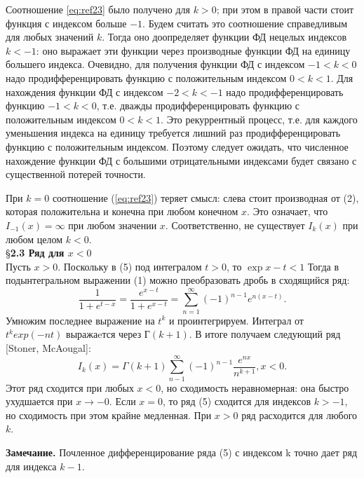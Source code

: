 Соотношение \ref{eq:ref23} было получено для $k > 0$; при этом в правой части стоит
функция с индексом больше $-1$. Будем считать это соотношение справедливым
для любых значений $k$. Тогда оно доопределяет функции ФД нецелых индексов
$k < -1$: оно выражает эти функции через производные функции ФД на единицу
большего индекса. Очевидно, для получения функции ФД с индексом $-1 < k < 0$
надо продифференцировать функцию с положительным индексом $0 < k < 1$. Для
нахождения функции ФД с индексом $-2 < k < -1$ надо продифференцировать
функцию $-1< k < 0$, т.е. дважды продифференцировать функцию с
положительным индексом $0 < k < 1$. Это рекуррентный процесс, т.е. для
каждого уменьшения индекса на единицу требуется лишний раз
продифференцировать функцию с положительным индексом. Поэтому следует
ожидать, что численное нахождение функции ФД с большими отрицательными
индексами будет связано с существенной потерей точности.

При $k = 0$ соотношение (\ref{eq:ref23}) теряет смысл: слева стоит производная от (2),
которая положительна и конечна при любом конечном $x$. Это означает, что
$I_{-1}(x) = \infty$ при любом значении $x$. Соответственно, не существует $I_k(x)$ при
любом целом $k < 0$.
\\

\S \textbf{2.3 Ряд для $x < 0$}
\\

Пусть $x > 0$. Поскольку в (5) под интегралом $t > 0$, то $\exp{x-t} < 1$ Тогда в
подынтегральном выражении (1) можно преобразовать дробь в сходящийся
ряд:
\begin{equation}
\frac{1}{1+e^{t-x}} = \frac{e^{x-t}}{1+e^{x-t}}=\sum\limits_{n=1}^{\infty} (-1)^{n-1}e^{n(x-t)}.
\end{equation}
Умножим последнее выражение на $t^k$ и проинтегрируем. Интеграл от
$t^{k}exp(-nt)$ выражаeтся через $Г(k + 1)$. В итоге получаем следующий ряд [Stoner, McAougal]:
\begin{equation}
I_k(x)=\Gamma(k+1)\sum\limits_{n-1}^{\infty} (-1)^{n-1}\frac{e^{nx}}{n^{k+1}},x<0.
\end{equation}
Этот ряд сходится при любых $x < 0$, но сходимость неравномерная: она быстро
ухудшается при $x \to -0$. Если $x = 0$, то ряд (5) сходится для индексов $k > -1$, но
сходимость при этом крайне медленная. При $x > 0$ ряд расходится для любого
$k$.

\textbf{Замечание.} Почленное дифференцирование ряда (5) с индексом k точно
дает ряд для индекса $k - 1$.
\\

